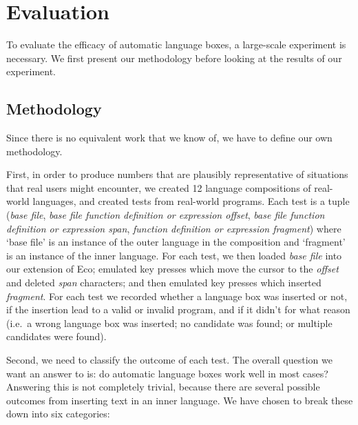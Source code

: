 \documentclass[sigplan,screen]{acmart}\settopmatter{printfolios=true,printccs=false,printacmref=false}
\begin{document}
\section{Evaluation}
\label{sec:evaluation}

To evaluate the efficacy of automatic language boxes, a large-scale experiment
is necessary. We first present our methodology before looking at the results of
our experiment.


\subsection{Methodology}

Since there is no equivalent work that we know of, we have to
define our own methodology.

First, in order to produce numbers that are plausibly representative of situations
that real users might encounter, we created 12 language compositions of
real-world languages, and created \totalinsertions tests from real-world
programs. Each test is a tuple (\emph{base file}, \emph{base file function
definition or expression offset}, \emph{base file function definition or
expression span}, \emph{function definition or expression fragment}) where
`base file' is an instance of the outer language in the composition and
`fragment' is an instance of the inner language. For each test, we then loaded
\emph{base file} into our extension of Eco; emulated key presses which move the
cursor to the \emph{offset} and deleted \emph{span} characters; and then
emulated key presses which inserted \emph{fragment}. For each test we recorded
 whether a language box was inserted or not, if
the insertion lead to a valid or invalid program, and if it didn't for what
reason (i.e.~a wrong language box was inserted; no candidate was found; or
multiple candidates were found).

Second, we need to classify the outcome of each test. The overall question we
want an answer to is: do automatic language boxes work well in most
cases? Answering this is not completely trivial, because there are several
possible outcomes from inserting text in an inner language. We have chosen to
break these down into six categories:
\end{document}
